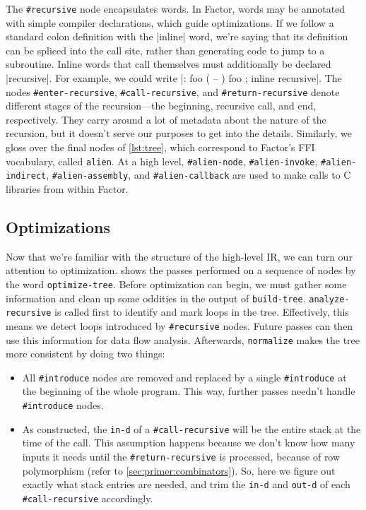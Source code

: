 
The \Verb|#recursive| node encapsulates  words.  In
Factor, words may be annotated with simple compiler declarations, which guide
optimizations.  If we follow a standard colon definition with the
\factor|inline| word, we're saying that its definition can be spliced into the
call site, rather than generating code to jump to a subroutine.  Inline words
that call themselves must additionally be declared \factor|recursive|.  For
example, we could write
%
\factor|: foo ( -- ) foo ; inline recursive|.
%
The nodes \Verb|#enter-recursive|, \Verb|#call-recursive|, and
\Verb|#return-recursive| denote different stages of the recursion---the
beginning, recursive call, and end, respectively.  They carry around a lot of
metadata about the nature of the recursion, but it doesn't serve our purposes
to get into the details.  Similarly, we gloss over the final nodes of
\vref{lst:tree}, which correspond to Factor's \gls{FFI} vocabulary, called
\Verb|alien|.  At a high level, \Verb|#alien-node|, \Verb|#alien-invoke|,
\Verb|#alien-indirect|, \Verb|#alien-assembly|, and \Verb|#alien-callback| are
used to make calls to C libraries from within Factor.

\subsection{Optimizations}

Now that we're familiar with the structure of the high-level \gls{IR}, we can
turn our attention to optimization.   shows the passes
performed on a sequence of nodes by the word \Verb|optimize-tree|.  Before
optimization can begin, we must gather some information and clean up some
oddities in the output of \Verb|build-tree|.  \Verb|analyze-recursive| is
called first to identify and mark loops in the tree.  Effectively, this means
we detect loops introduced by \Verb|#recursive| nodes.  Future passes can then
use this information for data flow analysis.  Afterwards, \Verb|normalize|
makes the tree more consistent by doing two things:
%
\begin{itemize}
%
  \item All \Verb|#introduce| nodes are removed and replaced by a single
        \Verb|#introduce| at the beginning of the whole program.  This way,
        further passes needn't handle \Verb|#introduce| nodes.
%
  \item As constructed, the \Verb|in-d| of a \Verb|#call-recursive| will be
        the entire stack at the time of the call.  This assumption happens
        because we don't know how many inputs it needs until the
        \Verb|#return-recursive| is processed, because of row polymorphism
        (refer to \cref{sec:primer:combinators}).  So, here we figure out
        exactly what stack entries are needed, and trim the \Verb|in-d| and
        \Verb|out-d| of each \Verb|#call-recursive| accordingly.
%
\end{itemize}


